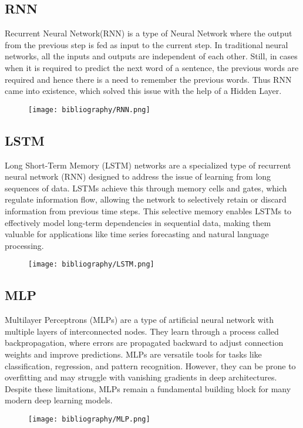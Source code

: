 \documentclass{ieeeojies}
\begin{document}
\subsection{RNN} 
Recurrent Neural Network(RNN) is a type of Neural Network where the output from the previous step is fed as input to the current step. In traditional neural networks, all the inputs and outputs are independent of each other. Still, in cases when it is required to predict the next word of a sentence, the previous words are required and hence there is a need to remember the previous words. Thus RNN came into existence, which solved this issue with the help of a Hidden Layer.
\begin{figure}[H]
    \centering
    \begin{minipage}{0.45\textwidth}
    \centering
    \texttt{[image: bibliography/RNN.png]}    
    \label{fig:1}
    \end{minipage}
\end{figure}
\subsection{LSTM} 
Long Short-Term Memory (LSTM) networks are a specialized type of recurrent neural network (RNN) designed to address the issue of learning from long sequences of data. LSTMs achieve this through memory cells and gates, which regulate information flow, allowing the network to selectively retain or discard information from previous time steps. This selective memory enables LSTMs to effectively model long-term dependencies in sequential data, making them valuable for applications like time series forecasting and natural language processing.
\begin{figure}[H]
    \centering
    \begin{minipage}{0.45\textwidth}
    \centering
    \texttt{[image: bibliography/LSTM.png]}    
    \label{fig:1}
    \end{minipage}
\end{figure}
\subsection{MLP} 
Multilayer Perceptrons (MLPs) are a type of artificial neural network with multiple layers of interconnected nodes. They learn through a process called backpropagation, where errors are propagated backward to adjust connection weights and improve predictions. MLPs are versatile tools for tasks like classification, regression, and pattern recognition. However, they can be prone to overfitting and may struggle with vanishing gradients in deep architectures. Despite these limitations, MLPs remain a fundamental building block for many modern deep learning models.
\begin{figure}[H]
    \centering
    \begin{minipage}{0.45\textwidth}
    \centering
    \texttt{[image: bibliography/MLP.png]}    
    \label{fig:1}
    \end{minipage}
\end{figure}
\end{document}
